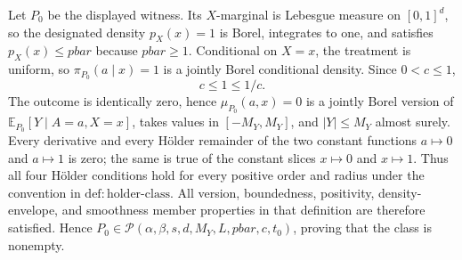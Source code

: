 Let \(P_0\) be the displayed witness. Its \(X\)-marginal is Lebesgue measure on \([0,1]^d\), so the designated density \(p_X(x)=1\) is Borel, integrates to one, and satisfies \(p_X(x)\le pbar\) because \(pbar\ge1\). Conditional on \(X=x\), the treatment is uniform, so \(\pi_{P_0}(a\mid x)=1\) is a jointly Borel conditional density. Since \(0<c\le1\), \[c\le1\le 1/c.\] The outcome is identically zero, hence \(\mu_{P_0}(a,x)=0\) is a jointly Borel version of \(\mathbb E_{P_0}[Y\mid A=a,X=x]\), takes values in \([-M_Y,M_Y]\), and \(\lvert Y\rvert\le M_Y\) almost surely. Every derivative and every Hölder remainder of the two constant functions \(a\mapsto0\) and \(a\mapsto1\) is zero; the same is true of the constant slices \(x\mapsto0\) and \(x\mapsto1\). Thus all four Hölder conditions hold for every positive order and radius under the convention in \(\mathrm{def:holder\text{-}class}\). All version, boundedness, positivity, density-envelope, and smoothness member properties in that definition are therefore satisfied. Hence \(P_0\in\mathcal P(\alpha,\beta,s,d,M_Y,L,pbar,c,t_0)\), proving that the class is nonempty.